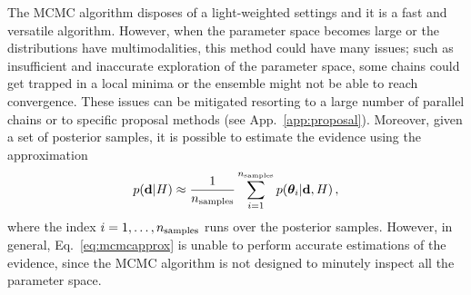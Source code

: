 \documentclass[prd,aps,twocolumn,a4paper,showkeys,nofootinbib,floatfix]{revtex4-1}
\newcommand{\be}{\begin{equation}}
\newcommand{\ee}{\end{equation}}
\def\params{\boldsymbol{\theta}}
\def\data{\textbf{d}}
\begin{document}
The MCMC algorithm disposes of a light-weighted settings
and it is a fast and versatile algorithm.
However, when the parameter space becomes large or the distributions have multimodalities,
this method could have many issues; 
such as insufficient and inaccurate exploration of the parameter space,
some chains could get trapped in a local minima or the 
ensemble might not be able to reach convergence.
These issues can be mitigated resorting to a large number of parallel chains
or to specific proposal methods (see App.~\ref{app:proposal}). 
Moreover, given a set of posterior samples, it is possible to estimate the evidence 
using the approximation
\be
\label{eq:mcmcapprox}
p(\data|H) \approx \frac{1}{n_{\rm samples}}\sum_{i=1}^{n_{\rm samples}} p(\params_i|\data,H)\,,
\ee
where the index $i=1,\dots,n_{\rm samples}$ runs over the posterior samples.
However, in general, Eq.~\eqref{eq:mcmcapprox} is unable to perform accurate estimations of the evidence,
since the MCMC algorithm is not designed to minutely inspect all the parameter space.
\end{document}
